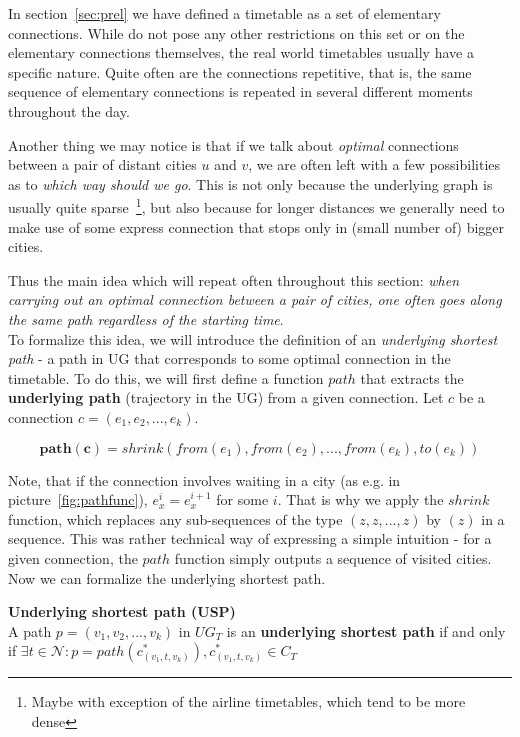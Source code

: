 In section~\ref{sec:prel} we have defined a timetable as a set of elementary connections. While do not pose any other restrictions on this set or on the elementary connections themselves, the real world timetables usually have a specific nature. Quite often are the connections repetitive, that is, the same sequence of elementary connections is repeated in several different moments throughout the day.

Another thing we may notice is that if we talk about \textit{optimal} connections between a pair of distant cities $u$ and $v$, we are often left with a few possibilities as to \textit{which way should we go}. This is not only because the underlying graph is usually quite sparse~\footnote{Maybe with exception of the airline timetables, which tend to be more dense}, but also because for longer distances we generally need to make use of some express connection that stops only in (small number of) bigger cities.

Thus the main idea which will repeat often throughout this section: \textit{when carrying out an optimal connection between a pair of cities, one often goes along the same path regardless of the starting time}. \\

\noindent To formalize this idea, we will introduce the definition of an \textit{underlying shortest path} - a path in UG that corresponds to some optimal connection in the timetable. To do this, we will first define a function $path$ that extracts the \textbf{underlying path} (trajectory in the UG) from a given connection. Let $c$ be a connection $c = (e_{1}, e_{2}, ..., e_{k})$.

\begin{equation*}
	\bm{path(c)} = shrink(from(e_{1}), from(e_{2}), ..., from(e_{k}), to(e_{k}))
\end{equation*}

\noindent Note, that if the connection involves waiting in a city (as e.g. in picture~\ref{fig:pathfunc}), $e_{x}^{i} = e_{x}^{i + 1}$ for some $i$. That is why we apply the $shrink$ function, which replaces any sub-sequences of the type $(z, z, ..., z)$ by $(z)$ in a sequence. This was rather technical way of expressing a simple intuition - for a given connection, the $path$ function simply outputs a sequence of visited cities. Now we can formalize the underlying shortest path.

\begin{definition}
        \textbf{Underlying shortest path (USP)} \\
	A path $p = (v_{1}, v_{2}, ..., v_{k})$ in $UG_{T}$ is an \textbf{underlying shortest path} if and only if $\exists t \in \mathcal{N}: p = path(c_{(v_{1}, t, v_{k})}^{*}), c_{(v_{1}, t, v_{k})}^{*} \in C_{T}$
\end{definition}
    
